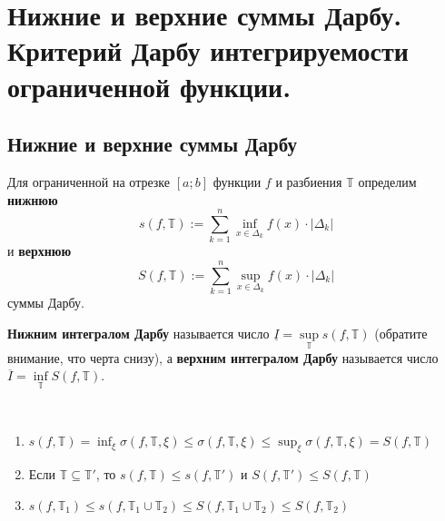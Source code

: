 \documentclass[a4paper]{article}
\theoremstyle{named}
\newcommand{\T}{\mathbb{T}}
\begin{document}
    \section{Нижние и верхние суммы Дарбу. Критерий Дарбу интегрируемости ограниченной функции.}

        \subsection{Нижние и верхние суммы Дарбу}

        \begin{definition*}
            Для ограниченной на отрезке $[a; b]$ функции $f$ и разбиения $\T$ определим \textbf{нижнюю}
            \begin{equation*}
                s(f, \T) := \sum_{k = 1}^n \inf\limits_{x \in \Delta_k} f(x) \cdot |\Delta_k|
            \end{equation*}
            и \textbf{верхнюю}
            \begin{equation*}
                S(f, \T) := \sum_{k = 1}^n \sup\limits_{x \in \Delta_k} f(x) \cdot |\Delta_k|
            \end{equation*}
            суммы Дарбу.

            \textbf{Нижним интегралом Дарбу} называется число $\underline{I} = \sup\limits_{\T} s(f, \T)$ (обратите внимание, что черта снизу), а \textbf{верхним интегралом Дарбу} называется число $\overline{I} = \inf\limits_{\T} S(f, \T)$. 
        \end{definition*}

        \begin{lemma*}~

            \begin{enumerate}
            \item
                $s(f, \T) = \inf_{\xi} \sigma(f, \T, \xi) \leq \sigma(f, \T, \xi) \leq \sup_{\xi} \sigma(f, \T, \xi) = S(f, \T)$

            \item
                Если $\T \subseteq \T'$, то $s(f, \T) \leq s(f, \T')$ и $S(f, \T') \leq S(f, \T)$

            \item
                $s(f, \T_1) \leq s(f, \T_1 \cup \T_2) \leq S(f, \T_1 \cup \T_2) \leq S(f, \T_2)$
            \end{enumerate}
        \end{lemma*}
\end{document}
